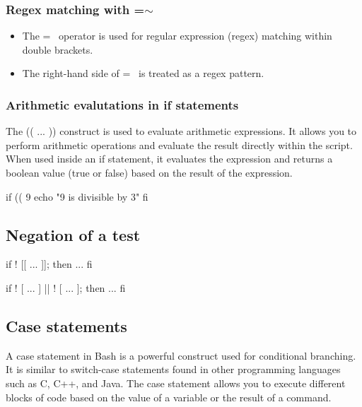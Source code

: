 \documentclass{report}
\begin{document}
    \bigbreak \noindent 
    \subsubsection{Regex matching with =$\sim$}
    \bigbreak \noindent 
    \begin{itemize}
        \item The =~ operator is used for regular expression (regex) matching within double brackets.
        \item The right-hand side of =~ is treated as a regex pattern.
    \end{itemize}

    \bigbreak \noindent
    \subsubsection{Arithmetic evalutations in if statements}
    \bigbreak \noindent 
    The (( ... )) construct is used to evaluate arithmetic expressions. It allows you to perform arithmetic operations and evaluate the result directly within the script. When used inside an if statement, it evaluates the expression and returns a boolean value (true or false) based on the result of the expression.
    \bigbreak \noindent 
    \begin{bashcode}
    if (( 9 %
        echo "9 is divisible by 3"
    fi 
    \end{bashcode}

    \bigbreak \noindent 
    \subsection{Negation of a test}
    \bigbreak \noindent 
    \begin{bashcode}
        if ! [[ ... ]]; then
            ...
        fi
    \end{bashcode}
    \bigbreak \noindent 
    \bigbreak \noindent 
    \begin{bashcode}
        if ! [ ... ] || ! [ ... ]; then
            ...
        fi
    \end{bashcode}
    

    \pagebreak \bigbreak \noindent 
    \subsection{Case statements}
    \bigbreak \noindent 
    A case statement in Bash is a powerful construct used for conditional branching. It is similar to switch-case statements found in other programming languages such as C, C++, and Java. The case statement allows you to execute different blocks of code based on the value of a variable or the result of a command.
    \bigbreak \noindent 
\end{document}
